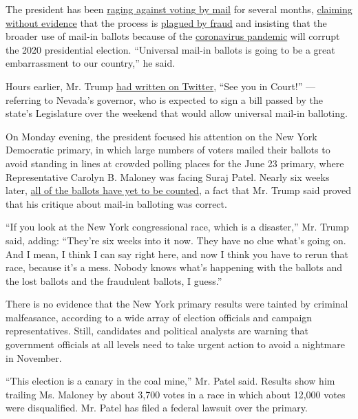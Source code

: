 The president has been
\href{https://www.nytimes.com/2020/06/24/us/politics/trump-vote-by-mail.html}{raging
against voting by mail} for several months,
\href{https://www.nytimes.com/article/mail-in-voting-explained.html}{claiming
without evidence} that the process is
\href{https://www.nytimes.com/2020/07/31/us/politics/trump-mail-voting-fraud.html}{plagued
by fraud} and insisting that the broader use of mail-in ballots because
of the
\href{https://www.nytimes.com/interactive/2020/us/coronavirus-us-cases.html}{coronavirus
pandemic} will corrupt the 2020 presidential election. ``Universal
mail-in ballots is going to be a great embarrassment to our country,''
he said.

Hours earlier, Mr. Trump
\href{https://twitter.com/realDonaldTrump/status/1290250416278532096?s=20}{had
written on Twitter}, ``See you in Court!'' --- referring to Nevada's
governor, who is expected to sign a bill passed by the state's
Legislature over the weekend that would allow universal mail-in
balloting.

On Monday evening, the president focused his attention on the New York
Democratic primary, in which large numbers of voters mailed their
ballots to avoid standing in lines at crowded polling places for the
June 23 primary, where Representative Carolyn B. Maloney was facing
Suraj Patel. Nearly six weeks later,
\href{https://www.nytimes.com/2020/08/03/nyregion/nyc-mail-ballots-voting.html}{all
of the ballots have yet to be counted}, a fact that Mr. Trump said
proved that his critique about mail-in balloting was correct.

``If you look at the New York congressional race, which is a disaster,''
Mr. Trump said, adding: ``They're six weeks into it now. They have no
clue what's going on. And I mean, I think I can say right here, and now
I think you have to rerun that race, because it's a mess. Nobody knows
what's happening with the ballots and the lost ballots and the
fraudulent ballots, I guess.''

There is no evidence that the New York primary results were tainted by
criminal malfeasance, according to a wide array of election officials
and campaign representatives. Still, candidates and political analysts
are warning that government officials at all levels need to take urgent
action to avoid a nightmare in November.

``This election is a canary in the coal mine,'' Mr. Patel said. Results
show him trailing Ms. Maloney by about 3,700 votes in a race in which
about 12,000 votes were disqualified. Mr. Patel has filed a federal
lawsuit over the primary.

